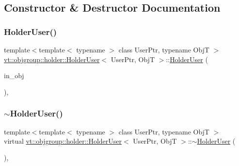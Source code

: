 \subsection{Constructor \& Destructor Documentation}
\mbox{\label{structvt_1_1objgroup_1_1holder_1_1_holder_user_a5c81ffca6d44450a02c9d74c650d2178}} 
\subsubsection{\texorpdfstring{Holder\+User()}{HolderUser()}}
{\footnotesize\ttfamily template$<$template$<$ typename $>$ class User\+Ptr, typename ObjT $>$ \\
\hyperlink{structvt_1_1objgroup_1_1holder_1_1_holder_user}{vt\+::objgroup\+::holder\+::\+Holder\+User}$<$ User\+Ptr, ObjT $>$\+::\hyperlink{structvt_1_1objgroup_1_1holder_1_1_holder_user}{Holder\+User} (\begin{DoxyParamCaption}\item[{User\+Ptr$<$ ObjT $>$}]{in\+\_\+obj }\end{DoxyParamCaption})\hspace{0.3cm}{\ttfamily [inline]}, {\ttfamily [explicit]}}

\mbox{\label{structvt_1_1objgroup_1_1holder_1_1_holder_user_a694de38808a7075ef8fa919d9e983c8b}} 
\subsubsection{\texorpdfstring{$\sim$\+Holder\+User()}{~HolderUser()}}
{\footnotesize\ttfamily template$<$template$<$ typename $>$ class User\+Ptr, typename ObjT $>$ \\
virtual \hyperlink{structvt_1_1objgroup_1_1holder_1_1_holder_user}{vt\+::objgroup\+::holder\+::\+Holder\+User}$<$ User\+Ptr, ObjT $>$\+::$\sim$\hyperlink{structvt_1_1objgroup_1_1holder_1_1_holder_user}{Holder\+User} (\begin{DoxyParamCaption}{ }\end{DoxyParamCaption})\hspace{0.3cm}{\ttfamily [virtual]}, {\ttfamily [default]}}



